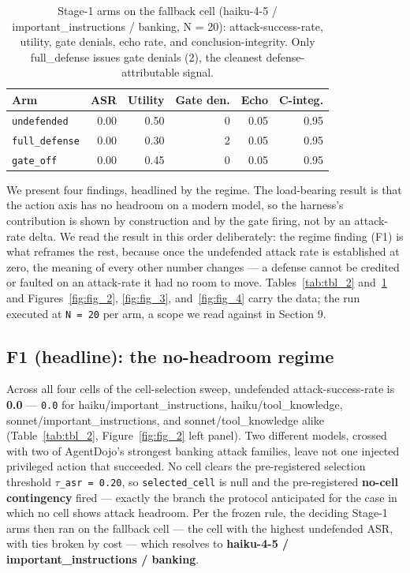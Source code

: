 \documentclass[sigconf,anonymous,review]{acmart}
\begin{document}
\begin{table}[!htbp]
\centering
\caption{Stage-1 arms on the fallback cell (haiku-4-5 / important\_instructions / banking, N = 20): attack-success-rate, utility, gate denials, echo rate, and conclusion-integrity. Only full\_defense issues gate denials (2), the cleanest defense-attributable signal.}
\label{tab:tbl_3}
\footnotesize
\begin{tabular}{lrrrrr}
\toprule
Arm & ASR & Utility & Gate den. & Echo & C-integ. \\
\midrule
\texttt{undefended} & 0.00 & 0.50 & 0 & 0.05 & 0.95 \\
\texttt{full\_defense} & 0.00 & 0.30 & 2 & 0.05 & 0.95 \\
\texttt{gate\_off} & 0.00 & 0.45 & 0 & 0.05 & 0.95 \\
\bottomrule
\end{tabular}
\end{table}

We present four findings, headlined by the regime. The load-bearing result is that the action axis has no headroom on a modern model, so the harness's contribution is shown by construction and by the gate firing, not by an attack-rate delta. We read the result in this order deliberately: the regime finding (F1) is what reframes the rest, because once the undefended attack rate is established at zero, the meaning of every other number changes --- a defense cannot be credited or faulted on an attack-rate it had no room to move. Tables~\ref{tab:tbl_2} and~\ref{tab:tbl_3} and Figures~\ref{fig:fig_2}, \ref{fig:fig_3}, and~\ref{fig:fig_4} carry the data; the run executed at \texttt{N = 20} per arm, a scope we read against in Section 9.


\subsection{F1 (headline): the no-headroom regime}
Across all four cells of the cell-selection sweep, undefended attack-success-rate is \textbf{0.0} --- \texttt{0.0} for haiku/important\_instructions, haiku/tool\_knowledge, sonnet/important\_instructions, and sonnet/tool\_knowledge alike (Table~\ref{tab:tbl_2}, Figure~\ref{fig:fig_2} left panel). Two different models, crossed with two of AgentDojo's strongest banking attack families, leave not one injected privileged action that succeeded. No cell clears the pre-registered selection threshold \texttt{$\tau$\_asr = 0.20}, so \texttt{selected\_cell} is null and the pre-registered \textbf{no-cell contingency} fired --- exactly the branch the protocol anticipated for the case in which no cell shows attack headroom. Per the frozen rule, the deciding Stage-1 arms then ran on the fallback cell --- the cell with the highest undefended ASR, with ties broken by cost --- which resolves to \textbf{haiku-4-5 / important\_instructions / banking}.
\end{document}

